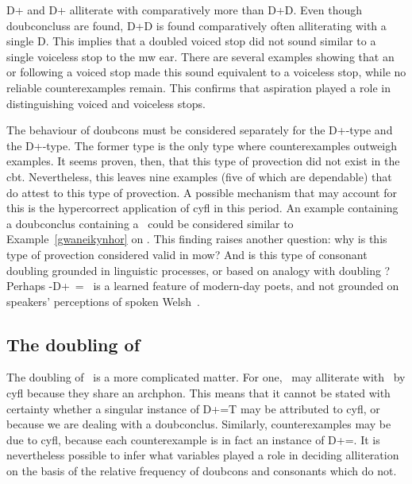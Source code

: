 \gls{D}+ and \gls{D}+ alliterate with  comparatively more than \gls{D}+\gls{D}. Even though \gls{doubconclus}s are found, \gls{D}+\gls{D} is found comparatively often alliterating with a single \gls{D}. This implies that a doubled voiced stop did not sound similar to a single voiceless stop to the \gls{mw} ear. There are several examples showing that  an  or  following a voiced stop made this sound equivalent to a voiceless stop, while no reliable counterexamples remain. This confirms  that aspiration played a role in distinguishing voiced and voiceless stops. 

The behaviour of \gls{doubcon}s must be considered separately for the \gls{D}+\xD-type and the \gls{D}+\lT-type. The former type is the only type where counterexamples outweigh examples. It seems proven, then, that this type of provection did not exist in the \gls{cbt}. Nevertheless, this leaves nine examples (five of which are dependable) that do attest to this type of provection. A possible mechanism that may account for this is the hypercorrect application of \gls{cyfl} in this period. An example containing a \gls{doubconclus} containing a \xD\ could be considered similar to Example~\ref{gwaneikynhor} on . This finding raises another question: why is this type of provection considered valid in \gls{mow}?  And is this type of consonant doubling grounded in linguistic processes, or based on analogy with doubling \lT? Perhaps -\gls{D}+\xD\ = \xT\ is a learned feature of modern-day poets, and  not  grounded on speakers' perceptions of spoken Welsh~\autocite{jones_y_2015}.

\subsection{The doubling of {\lT}}
The doubling of \lT\ is a more complicated matter. For one, \lT\ may alliterate with \xT\ by \gls{cyfl} because they share an \gls{archphon}. This means that it cannot be stated with certainty whether a singular instance of \gls{D}+\lT=\gls{T} may be attributed to \gls{cyfl}, or because we are dealing with a \gls{doubconclus}. Similarly, counterexamples may be due to \gls{cyfl}, because each counterexample is in fact an instance of \gls{D}+\lT=\lT. It is nevertheless possible to infer what variables played a role in deciding alliteration on the basis of the relative frequency of \gls{doubcon}s and consonants which do not. 

